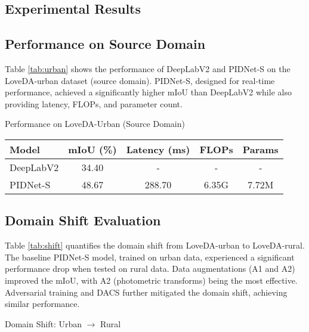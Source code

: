 \documentclass{article}
\begin{document}
\begin{multicols}{2}
		\section{Experimental Results}
		\subsection{Performance on Source Domain}
		Table \ref{tab:urban} shows the performance of DeepLabV2 and PIDNet-S on the LoveDA-urban dataset (source domain). PIDNet-S, designed for real-time performance, achieved a significantly higher mIoU than DeepLabV2 while also providing latency, FLOPs, and parameter count.
		
			\vspace{2cm}
			\centering
			\caption{Performance on LoveDA-Urban (Source Domain)}
			\label{tab:urban}
			\tiny
			\begin{tabular}{|l|c|c|c|c|}
				\hline
				Model & mIoU (\%) & Latency (ms) & FLOPs & Params \\ \hline
				DeepLabV2 & 34.40 & - & - & - \\ \hline
				PIDNet-S & 48.67 & 288.70 & 6.35G & 7.72M \\ \hline
			\end{tabular}
				\vspace{0.2cm}
		
		
		
		

		
		\subsection{Domain Shift Evaluation}
		Table \ref{tab:shift} quantifies the domain shift from LoveDA-urban to LoveDA-rural. The baseline PIDNet-S model, trained on urban data, experienced a significant performance drop when tested on rural data. Data augmentations (A1 and A2) improved the mIoU, with A2 (photometric transforms) being the most effective. Adversarial training and DACS further mitigated the domain shift, achieving similar performance.
		

			\centering
			\caption{Domain Shift: Urban $\rightarrow$ Rural}
			\label{tab:shift}


\end{multicols}
\end{document}
